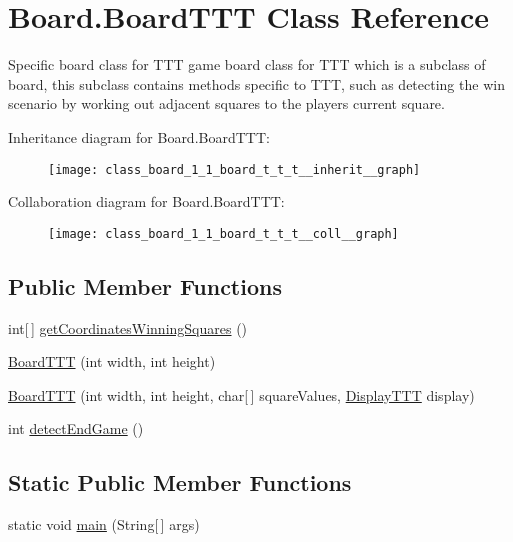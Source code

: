 \hypertarget{class_board_1_1_board_t_t_t}{}\section{Board.\+Board\+T\+T\+T Class Reference}
\label{class_board_1_1_board_t_t_t}


Specific board class for T\+T\+T game board class for T\+T\+T which is a subclass of board, this subclass contains methods specific to T\+T\+T, such as detecting the win scenario by working out adjacent squares to the players current square.  




Inheritance diagram for Board.\+Board\+T\+T\+T\+:
\nopagebreak
\begin{figure}[H]
\begin{center}
\leavevmode
\texttt{[image: class\_board\_1\_1\_board\_t\_t\_t\_\_inherit\_\_graph]}
\end{center}
\end{figure}


Collaboration diagram for Board.\+Board\+T\+T\+T\+:
\nopagebreak
\begin{figure}[H]
\begin{center}
\leavevmode
\texttt{[image: class\_board\_1\_1\_board\_t\_t\_t\_\_coll\_\_graph]}
\end{center}
\end{figure}
\subsection*{Public Member Functions}
\begin{DoxyCompactItemize}
\item 
int\mbox{[}$\,$\mbox{]} \hyperlink{class_board_1_1_board_t_t_t_a14ae6a700a6f83643afd3da120c1ee26}{get\+Coordinates\+Winning\+Squares} ()
\item 
\hyperlink{class_board_1_1_board_t_t_t_ac79a9beb148634225ef350d3ca0628ad}{Board\+T\+T\+T} (int width, int height)
\item 
\hyperlink{class_board_1_1_board_t_t_t_a3a5fc9e11157089f888727ba696fc2e4}{Board\+T\+T\+T} (int width, int height, char\mbox{[}$\,$\mbox{]} square\+Values, \hyperlink{class_display_1_1_display_t_t_t}{Display\+T\+T\+T} display)
\item 
int \hyperlink{class_board_1_1_board_t_t_t_a08f36da4210111d8f129be28a550334e}{detect\+End\+Game} ()
\end{DoxyCompactItemize}
\subsection*{Static Public Member Functions}
\begin{DoxyCompactItemize}
\item 
static void \hyperlink{class_board_1_1_board_t_t_t_a1b62648f4ca1d4a074767027b9c8eec0}{main} (String\mbox{[}$\,$\mbox{]} args)
\end{DoxyCompactItemize}
